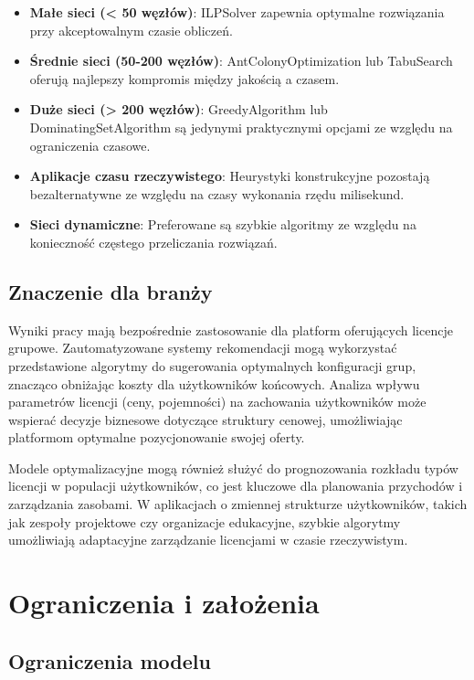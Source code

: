 \begin{itemize}
\item \textbf{Małe sieci (< 50 węzłów)}: ILPSolver zapewnia optymalne rozwiązania przy akceptowalnym czasie obliczeń.

\item \textbf{Średnie sieci (50-200 węzłów)}: AntColonyOptimization lub TabuSearch oferują najlepszy kompromis między jakością a czasem.

\item \textbf{Duże sieci (> 200 węzłów)}: GreedyAlgorithm lub DominatingSetAlgorithm są jedynymi praktycznymi opcjami ze względu na ograniczenia czasowe.

\item \textbf{Aplikacje czasu rzeczywistego}: Heurystyki konstrukcyjne pozostają bezalternatywne ze względu na czasy wykonania rzędu milisekund.

\item \textbf{Sieci dynamiczne}: Preferowane są szybkie algoritmy ze względu na konieczność częstego przeliczania rozwiązań.
\end{itemize}

\subsection{Znaczenie dla branży}

Wyniki pracy mają bezpośrednie zastosowanie dla platform oferujących licencje grupowe. Zautomatyzowane systemy rekomendacji mogą wykorzystać przedstawione algorytmy do sugerowania optymalnych konfiguracji grup, znacząco obniżając koszty dla użytkowników końcowych. Analiza wpływu parametrów licencji (ceny, pojemności) na zachowania użytkowników może wspierać decyzje biznesowe dotyczące struktury cenowej, umożliwiając platformom optymalne pozycjonowanie swojej oferty.

Modele optymalizacyjne mogą również służyć do prognozowania rozkładu typów licencji w populacji użytkowników, co jest kluczowe dla planowania przychodów i zarządzania zasobami. W aplikacjach o zmiennej strukturze użytkowników, takich jak zespoły projektowe czy organizacje edukacyjne, szybkie algorytmy umożliwiają adaptacyjne zarządzanie licencjami w czasie rzeczywistym.

\section{Ograniczenia i założenia}

\subsection{Ograniczenia modelu}

